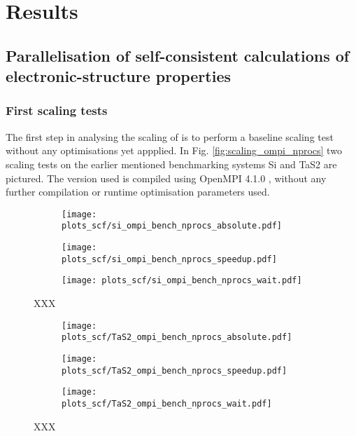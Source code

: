 \documentclass[main.tex]{subfiles}
\begin{document}
\chapter{Results}

\section{Parallelisation of self-consistent calculations of electronic-structure properties}

\subsection{First scaling tests}

The first step in analysing the scaling of \QE is to perform a baseline scaling test without any optimisations yet appplied. 
In Fig. \ref{fig:scaling_ompi_nprocs} two scaling tests on the earlier mentioned benchmarking systems Si and TaS2 are pictured. 
The \QE version used is compiled using OpenMPI 4.1.0 , without any further compilation or runtime optimisation parameters used.

\begin{figure}[htbp]
\begin{subfigure}[b]{0.3\textwidth}
    \centering
    \texttt{[image: plots\_scf/si\_ompi\_bench\_nprocs\_absolute.pdf]}
\end{subfigure}
\begin{subfigure}[b]{0.3\textwidth}
    \centering
    \texttt{[image: plots\_scf/si\_ompi\_bench\_nprocs\_speedup.pdf]}
\end{subfigure}
\begin{subfigure}[b]{0.3\textwidth}
    \centering
    \texttt{[image: plots\_scf/si\_ompi\_bench\_nprocs\_wait.pdf]}
\end{subfigure}
\caption{XXX}
\label{fig:scaling_ompi_nprocs_si}
\end{figure}

\begin{figure}[htbp]
\begin{subfigure}[b]{0.3\textwidth}
    \centering
    \texttt{[image: plots\_scf/TaS2\_ompi\_bench\_nprocs\_absolute.pdf]}
\end{subfigure}
\begin{subfigure}[b]{0.3\textwidth}
    \centering
    \texttt{[image: plots\_scf/TaS2\_ompi\_bench\_nprocs\_speedup.pdf]}
\end{subfigure}
\begin{subfigure}[b]{0.3\textwidth}
    \centering
    \texttt{[image: plots\_scf/TaS2\_ompi\_bench\_nprocs\_wait.pdf]}
\end{subfigure}
\caption{XXX}
\label{fig:scaling_ompi_nprocs_tas2}
\end{figure}
\end{document}
